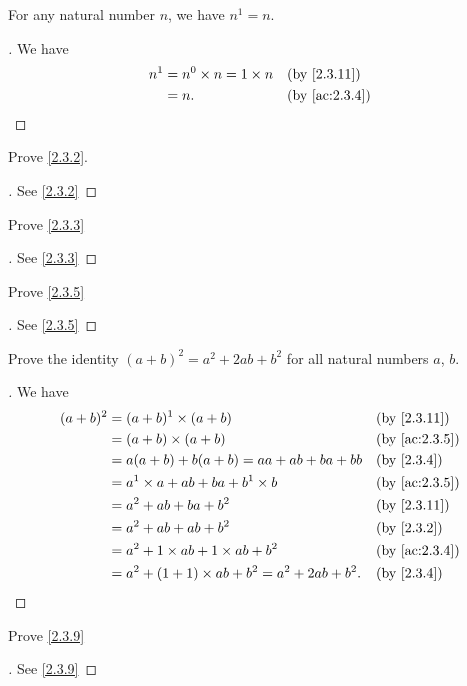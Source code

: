 \begin{ac}\label{ac:2.3.5}
  For any natural number \(n\), we have \(n^1 = n\).
\end{ac}

\begin{proof}[]
  We have
  \begin{align*}
    n^1 & = n^0 \times n = 1 \times n &  & \by{2.3.11}   \\
        & = n.                        &  & \by{ac:2.3.4}
  \end{align*}
\end{proof}

\exercisesection

\begin{ex}\label{ex:2.3.1}
  Prove \cref{2.3.2}.
\end{ex}

\begin{proof}[]
  See \cref{2.3.2}
\end{proof}

\begin{ex}\label{ex:2.3.2}
  Prove \cref{2.3.3}
\end{ex}

\begin{proof}[]
  See \cref{2.3.3}
\end{proof}

\begin{ex}\label{ex:2.3.3}
  Prove \cref{2.3.5}
\end{ex}

\begin{proof}[]
  See \cref{2.3.5}
\end{proof}

\begin{ex}\label{ex:2.3.4}
  Prove the identity \((a + b)^2 = a^2 + 2ab + b^2\) for all natural numbers \(a\), \(b\).
\end{ex}

\begin{proof}[]
  We have
  \begin{align*}
    (a + b)^2 & = (a + b)^1 \times (a + b)                         &  & \by{2.3.11}   \\
              & = (a + b) \times (a + b)                           &  & \by{ac:2.3.5} \\
              & = a(a + b) + b(a + b) = aa + ab + ba + bb          &  & \by{2.3.4}    \\
              & = a^1 \times a + ab + ba + b^1 \times b            &  & \by{ac:2.3.5} \\
              & = a^2 + ab + ba + b^2                              &  & \by{2.3.11}   \\
              & = a^2 + ab + ab + b^2                              &  & \by{2.3.2}    \\
              & = a^2 + 1 \times ab + 1 \times ab + b^2            &  & \by{ac:2.3.4} \\
              & = a^2 + (1 + 1) \times ab + b^2 = a^2 + 2ab + b^2. &  & \by{2.3.4}
  \end{align*}
\end{proof}

\begin{ex}\label{ex:2.3.5}
  Prove \cref{2.3.9}
\end{ex}

\begin{proof}[]
  See \cref{2.3.9}
\end{proof}
